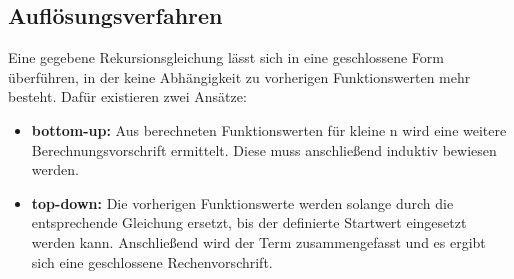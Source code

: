 \documentclass[11pt,a4paper]{scrartcl}
\begin{document}
\subsection{Auflösungsverfahren}
Eine gegebene Rekursionsgleichung lässt sich in eine geschlossene Form überführen, in der keine Abhängigkeit zu vorherigen Funktionswerten mehr besteht. Dafür existieren zwei Ansätze: 
\begin{itemize}
\item \textbf{bottom-up:} Aus berechneten Funktionswerten für kleine n wird eine weitere Berechnungsvorschrift ermittelt. Diese muss anschließend induktiv bewiesen werden.
\item \textbf{top-down:} Die vorherigen Funktionswerte werden solange durch die entsprechende Gleichung ersetzt, bis der definierte Startwert eingesetzt werden kann. Anschließend wird der Term zusammengefasst und es ergibt sich eine geschlossene Rechenvorschrift. 
\end{itemize}
\end{document}
